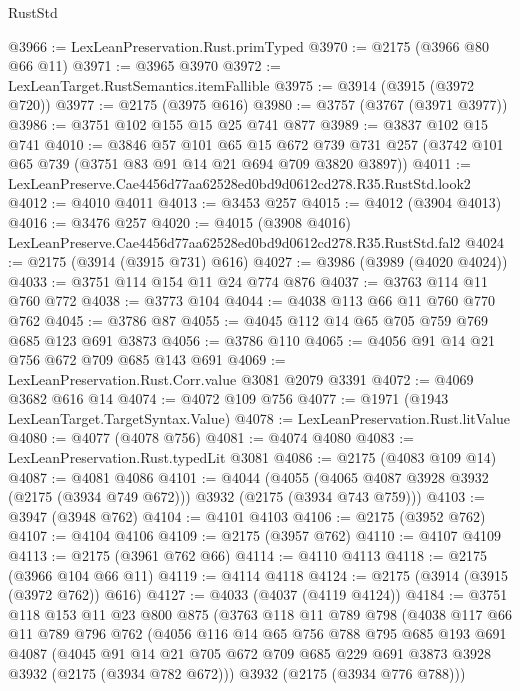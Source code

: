 \begin{lexlean}{RustStd}
\begin{coremodule}
@3966 := LexLeanPreservation.Rust.primTyped
@3970 := @2175 (@3966 @80 @66 @11)
@3971 := @3965 @3970
@3972 := LexLeanTarget.RustSemantics.itemFallible
@3975 := @3914 (@3915 (@3972 @720))
@3977 := @2175 (@3975 @616)
@3980 := @3757 (@3767 (@3971 @3977))
@3986 := @3751 @102 @155 @15 @25 @741 @877
@3989 := @3837 @102 @15 @741
@4010 := @3846
    @57
    @101
    @65
    @15
    @672
    @739
    @731
    @257
    (@3742 @101 @65 @739 (@3751 @83 @91 @14 @21 @694 @709 @3820 @3897))
@4011 := LexLeanPreserve.Cae4456d77aa62528ed0bd9d0612cd278.R35.RustStd.look2
@4012 := @4010 @4011
@4013 := @3453 @257
@4015 := @4012 (@3904 @4013)
@4016 := @3476 @257
@4020 := @4015 (@3908 @4016) LexLeanPreserve.Cae4456d77aa62528ed0bd9d0612cd278.R35.RustStd.fal2
@4024 := @2175 (@3914 (@3915 @731) @616)
@4027 := @3986 (@3989 (@4020 @4024))
@4033 := @3751 @114 @154 @11 @24 @774 @876
@4037 := @3763 @114 @11 @760 @772
@4038 := @3773 @104
@4044 := @4038 @113 @66 @11 @760 @770 @762
@4045 := @3786 @87
@4055 := @4045 @112 @14 @65 @705 @759 @769 @685 @123 @691 @3873
@4056 := @3786 @110
@4065 := @4056 @91 @14 @21 @756 @672 @709 @685 @143 @691
@4069 := LexLeanPreservation.Rust.Corr.value @3081 @2079 @3391
@4072 := @4069 @3682 @616 @14
@4074 := @4072 @109 @756
@4077 := @1971 (@1943 LexLeanTarget.TargetSyntax.Value)
@4078 := LexLeanPreservation.Rust.litValue
@4080 := @4077 (@4078 @756)
@4081 := @4074 @4080
@4083 := LexLeanPreservation.Rust.typedLit @3081
@4086 := @2175 (@4083 @109 @14)
@4087 := @4081 @4086
@4101 := @4044
    (@4055 (@4065 @4087 @3928 @3932 (@2175 (@3934 @749 @672))) @3932 (@2175 (@3934 @743 @759)))
@4103 := @3947 (@3948 @762)
@4104 := @4101 @4103
@4106 := @2175 (@3952 @762)
@4107 := @4104 @4106
@4109 := @2175 (@3957 @762)
@4110 := @4107 @4109
@4113 := @2175 (@3961 @762 @66)
@4114 := @4110 @4113
@4118 := @2175 (@3966 @104 @66 @11)
@4119 := @4114 @4118
@4124 := @2175 (@3914 (@3915 (@3972 @762)) @616)
@4127 := @4033 (@4037 (@4119 @4124))
@4184 := @3751
    @118
    @153
    @11
    @23
    @800
    @875
    (@3763
      @118
      @11
      @789
      @798
      (@4038
        @117
        @66
        @11
        @789
        @796
        @762
        (@4056
          @116
          @14
          @65
          @756
          @788
          @795
          @685
          @193
          @691
          @4087
          (@4045
            @91
            @14
            @21
            @705
            @672
            @709
            @685
            @229
            @691
            @3873
            @3928
            @3932
            (@2175 (@3934 @782 @672)))
          @3932
          (@2175 (@3934 @776 @788)))

\end{coremodule}
\end{lexlean}
